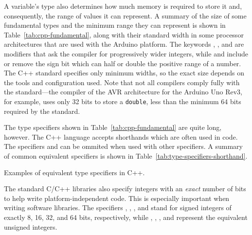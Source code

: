 A variable's type also determines how much memory is required to store it and, consequently, the range of values it can represent.
A summary of the size of some fundamental types and the minimum range they can represent is shown in Table~\ref{tab:cpp-fundamental}, along with their standard width in some processor architectures that are used with the Arduino platform.
The keywords , , and  are modifiers that ask the compiler for progressively wider integers, while  and  include or remove the sign bit which can half or double the positive range of a number. 
The C++ standard specifies only minimum widths, so the exact size depends on the tools and configuration used.
Note that not all compilers comply fully with the standard---the compiler of the AVR architecture for the Arduino Uno Rev3, for example, uses only 32 bits to store a \texttt{double}, less than the minimum 64 bits required by the standard.

The type specifiers shown in Table~\ref{tab:cpp-fundamental} are quite long, however.
The C++ language accepts shorthands which are often used in code.
The specifiers  and  can be ommited when used with other specifiers.
A summary of common equivalent specifiers is shown in Table~\ref{tab:type-specifiers-shorthand}.

\begin{table}
  \centering
  \caption{Examples of equivalent type specifiers in C++.}
  \label{tab:type-specifiers-shorthand}
\end{table}

The standard C/C++ libraries also specify integers with an \emph{exact} number of bits to help write platform-independent code.
This is especially important when writing software libraries.
The specifiers , , , and  stand for signed integers of exactly \num{8}, \num{16}, \num{32}, and \num{64} bits, respectively, while , , , and  represent the equivalent unsigned integers.

